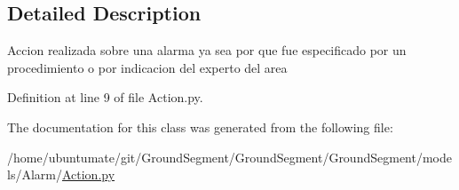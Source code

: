 \subsection{Detailed Description}
\begin{DoxyVerb}Accion realizada sobre una alarma ya sea por que fue especificado por un procedimiento
o por indicacion del experto del area
\end{DoxyVerb}
 

Definition at line 9 of file Action.\+py.



The documentation for this class was generated from the following file\+:\begin{DoxyCompactItemize}
\item 
/home/ubuntumate/git/\+Ground\+Segment/\+Ground\+Segment/\+Ground\+Segment/models/\+Alarm/\hyperlink{_action_8py}{Action.\+py}\end{DoxyCompactItemize}
